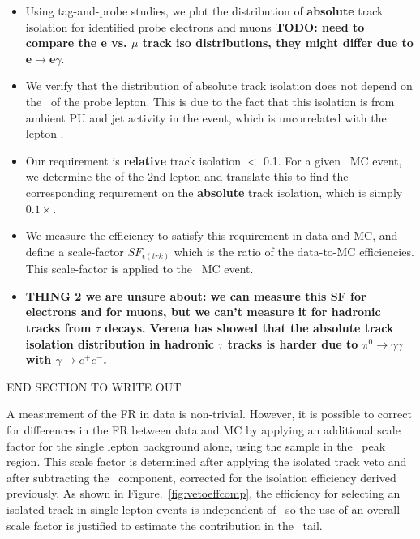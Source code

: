 \begin{itemize}
\item Using tag-and-probe studies, we plot the distribution of {\bf absolute} track isolation for identified probe electrons
and muons {\bf TODO: need to compare the e vs. $\mu$ track iso distributions, they might differ due to e$\to$e$\gamma$}.
\item We verify that the distribution of absolute track isolation does not depend on the \pt\ of the probe lepton.
This is due to the fact that this isolation is from ambient PU and jet activity in the event, which is uncorrelated with
the lepton .
\item Our requirement is {\bf relative} track isolation $<$ 0.1. For a given \ttll\ MC event, we determine the \pt of the 2nd
lepton and translate this to find the corresponding requirement on the {\bf absolute} track isolation, which is simply $0.1\times$\pt.
\item We measure the efficiency to satisfy this requirement in data and MC, and define a scale-factor $SF_{\epsilon(trk)}$ which
is the ratio of the data-to-MC efficiencies. This scale-factor is applied to the \ttll\ MC event.
\item {\bf THING 2 we are unsure about: we can measure this SF for electrons and for muons, but we can't measure it for hadronic 
tracks from $\tau$ decays. Verena has showed that the absolute track isolation distribution in hadronic $\tau$ tracks is harder due 
to $\pi^0\to\gamma\gamma$ with $\gamma\to e^+e^-$.}
\end{itemize} 
END SECTION TO WRITE OUT 

A measurement of the FR in data is non-trivial. However, it is
possible to correct for differences in the FR between data and MC by
applying an additional scale factor for the single lepton background
alone, using the sample in the \mt\ peak region. This scale factor is determined after applying the isolated track
veto and after subtracting the \ttll\ component, corrected for the
isolation efficiency derived previously. 
As shown in Figure.~\ref{fig:vetoeffcomp}, the efficiency for selecting an
isolated track in single lepton events is independent of \mt\, so the use of
an overall scale factor is justified to estimate the contribution in
the \mt\ tail. 

